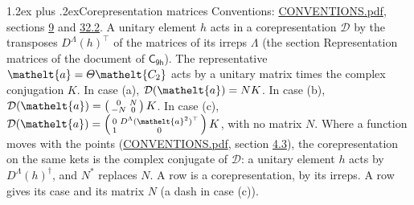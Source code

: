 \documentclass[10pt,a4paper]{article}
\makeatletter
\renewcommand\section{\@startsection{section}{1}{\z@}{-3ex plus -1ex minus -.2ex}%
  {1.2ex plus .2ex}{\normalfont\large\sffamily\bfseries\color{parttitle}}}
\numberwithin{equation}{section}
\newcommand{\eltfont}[1]{{\let\sigma\eltsigma\mathelt{#1}}}
\newcommand{\grp}[1]{\mathsf{#1}}
\newcommand{\elt}[1]{\eltfont{#1}}
\makeatother
\begin{document}
\section{Corepresentation matrices}\label{s:corep_matrices}
Conventions: \href{../../CONVENTIONS.pdf}{CONVENTIONS.pdf}, sections \href{../../../rotation/CONVENTIONS.pdf\#conv.9}{9} and \href{../../CONVENTIONS.pdf\#conv.32.2}{32.2}.
A unitary element $h$ acts in a corepresentation $\mathcal{D}$ by the transposes $D^{\Lambda}(h)^{\top}$ of the matrices of its irreps $\Lambda$ (the section Representation matrices of the document of \href{../../../rotation/data/pdf/C9h.pdf}{$\grp{C_{9h}}$}). The representative $\elt{a} = \varTheta\elt{C_{2}}$ acts by a unitary matrix times the complex conjugation $K$.
In case (a), $\mathcal{D}(\elt{a}) = NK$. In case (b), $\mathcal{D}(\elt{a}) = \left(\begin{smallmatrix} 0 & N \\ -N & 0 \end{smallmatrix}\right) K$. In case (c), $\mathcal{D}(\elt{a}) = \left(\begin{smallmatrix} 0 & D^{\Lambda}(\elt{a}^2)^{\top} \\ 1 & 0 \end{smallmatrix}\right) K$, with no matrix $N$.
Where a function moves with the points (\href{../../CONVENTIONS.pdf}{CONVENTIONS.pdf}, section \href{../../../rotation/CONVENTIONS.pdf\#conv.4.3}{4.3}), the corepresentation on the same kets is the complex conjugate of $\mathcal{D}$: a unitary element $h$ acts by $D^{\Lambda}(h)^{\dagger}$, and $N^{*}$ replaces $N$.
A row is a corepresentation, by its irreps. A row gives its case and its matrix $N$ (a dash in case (c)).
\end{document}
